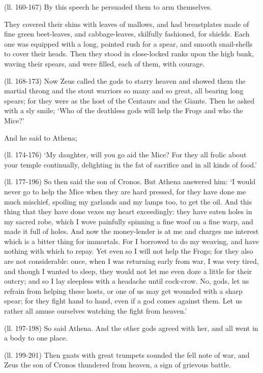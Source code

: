 (ll. 160-167) By this speech he persuaded them to arm themselves.

They covered their shins with leaves of mallows, and had breastplates made of
fine green beet-leaves, and cabbage-leaves, skilfully fashioned, for shields.
Each one was equipped with a long, pointed rush for a spear, and smooth
snail-shells to cover their heads. Then they stood in close-locked ranks upon
the high bank, waving their spears, and were filled, each of them, with
courage.

(ll. 168-173) Now Zeus called the gods to starry heaven and showed them the
martial throng and the stout warriors so many and so great, all bearing long
spears; for they were as the host of the Centaurs and the Giants. Then he asked
with a sly smile; ‘Who of the deathless gods will help the Frogs and who
the Mice?’

And he said to Athena;

(ll. 174-176) ‘My daughter, will you go aid the Mice? For they all frolic
about your temple continually, delighting in the fat of sacrifice and in all
kinds of food.’

(ll. 177-196) So then said the son of Cronos. But Athena answered him: ‘I
would never go to help the Mice when they are hard pressed, for they have done
me much mischief, spoiling my garlands and my lamps too, to get the oil. And
this thing that they have done vexes my heart exceedingly: they have eaten
holes in my sacred robe, which I wove painfully spinning a fine woof on a fine
warp, and made it full of holes. And now the money-lender is at me and charges
me interest which is a bitter thing for immortals. For I borrowed to do my
weaving, and have nothing with which to repay. Yet even so I will not help the
Frogs; for they also are not considerable: once, when I was returning early
from war, I was very tired, and though I wanted to sleep, they would not let me
even doze a little for their outcry; and so I lay sleepless with a headache
until cock-crow. No, gods, let us refrain from helping these hosts, or one of
us may get wounded with a sharp spear; for they fight hand to hand, even if a
god comes against them. Let us rather all amuse ourselves watching the fight
from heaven.’

(ll. 197-198) So said Athena. And the other gods agreed with her, and all went
in a body to one place.

(ll. 199-201) Then gnats with great trumpets sounded the fell note of war, and
Zeus the son of Cronos thundered from heaven, a sign of grievous battle.

